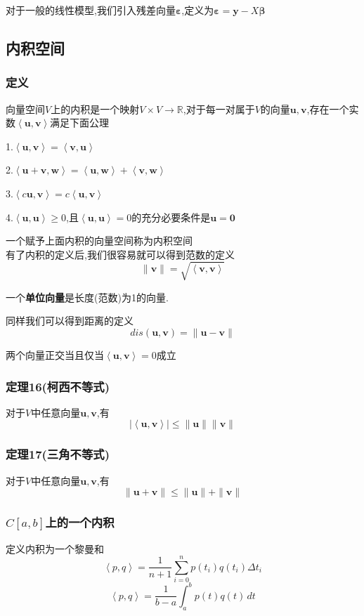 \documentclass{article}
\newcommand{\RR}{\mathbb{R}}
\newcommand{\ve}{\boldsymbol}
\newcommand{\ip}[1]{\left<#1\right>}
\begin{document}
\begin{CJK}{UTF8}{gkai}
对于一般的线性模型,我们引入残差向量$\ve{\varepsilon}$,定义为$\ve{\varepsilon} = \ve{y} - X \ve{\beta}$
\subsection{内积空间}
\subsubsection{定义}

向量空间$V$上的内积是一个映射$V\times V \rightarrow \RR$,对于每一对属于$V$的向量$\ve{u},\ve{v}$,存在一个实数$\ip{\ve{u},\ve{v}}$满足下面公理

1.$\ip{\ve{u},\ve{v}} =\ip{\ve{v},\ve{u}}$

2.$\ip{\ve{u}+\ve{v},\ve{w}} = \ip{\ve{u},\ve{w}} + \ip{\ve{v},\ve{w}}$

3.$\ip{c\ve{u},\ve{v}} = c\ip{\ve{u},\ve{v}}$

4.$\ip{\ve{u},\ve{u}} \geq 0$,且$\ip{\ve{u},\ve{u}} = 0$的充分必要条件是$\ve{u} = \ve{0}$

一个赋予上面内积的向量空间称为内积空间\\

有了内积的定义后,我们很容易就可以得到范数的定义
\[\|\ve{v}\| = \sqrt{\ip{\ve{v},\ve{v}}}\]

一个\textbf{单位向量}是长度(范数)为1的向量.

同样我们可以得到距离的定义
\[dis(\ve{u} , \ve{v}) = \|\ve{u} - \ve{v}\|\]

两个向量正交当且仅当$\ip{\ve{u},\ve{v}}= 0$成立

\subsubsection{定理16(柯西不等式)}
对于$V$中任意向量$\ve{u},\ve{v}$,有
\[|\left<\ve{u},\ve{v}\right>| \leq \|\ve{u}\|\|\ve{v}\|\]

\subsubsection{定理17(三角不等式)}
对于$V$中任意向量$\ve{u},\ve{v}$,有
\[\|\ve{u} + \ve{v}\| \leq \|\ve{u} \| + \|\ve{v}\|\]

\subsubsection{$C[a,b]$上的一个内积}
定义内积为一个黎曼和
\[\ip{p,q} = \dfrac{1}{n + 1} \sum_{i = 0}^{n} p(t_i)q(t_i) \Delta t_i\]
\[\ip{p,q} = \dfrac{1}{b - a}\int_{a}^{b}p(t)q(t)\,dt\]

\end{CJK}
\end{document}
